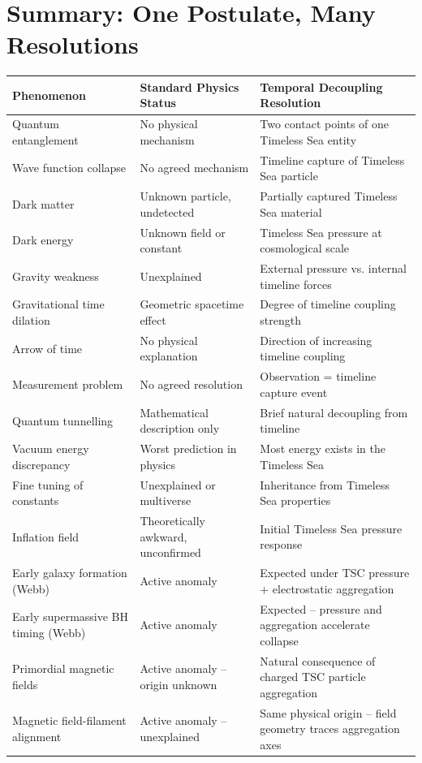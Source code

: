 \documentclass[11pt,a4paper]{article}
\begin{document}
\section{Summary: One Postulate, Many Resolutions}
\begin{center}
\begin{tabular}{p{3.5cm} p{4.5cm} p{5.5cm}}
\toprule
\textbf{Phenomenon} & \textbf{Standard Physics Status} & \textbf{Temporal Decoupling Resolution} \\
\midrule
Quantum entanglement & No physical mechanism & Two contact points of one Timeless Sea entity \\
Wave function collapse & No agreed mechanism & Timeline capture of Timeless Sea particle \\
Dark matter & Unknown particle, undetected & Partially captured Timeless Sea material \\
Dark energy & Unknown field or constant & Timeless Sea pressure at cosmological scale \\
Gravity weakness & Unexplained & External pressure vs. internal timeline forces \\
Gravitational time dilation & Geometric spacetime effect & Degree of timeline coupling strength \\
Arrow of time & No physical explanation & Direction of increasing timeline coupling \\
Measurement problem & No agreed resolution & Observation = timeline capture event \\
Quantum tunnelling & Mathematical description only & Brief natural decoupling from timeline \\
Vacuum energy discrepancy & Worst prediction in physics & Most energy exists in the Timeless Sea \\
Fine tuning of constants & Unexplained or multiverse & Inheritance from Timeless Sea properties \\
Inflation field & Theoretically awkward, unconfirmed & Initial Timeless Sea pressure response \\
Early galaxy formation (Webb) & Active anomaly & Expected under TSC pressure + electrostatic aggregation \\
Early supermassive BH timing (Webb) & Active anomaly & Expected -- pressure and aggregation accelerate collapse \\
Primordial magnetic fields & Active anomaly -- origin unknown & Natural consequence of charged TSC particle aggregation \\
Magnetic field-filament alignment & Active anomaly -- unexplained & Same physical origin -- field geometry traces aggregation axes \\

\end{tabular}
\end{center}
\end{document}
